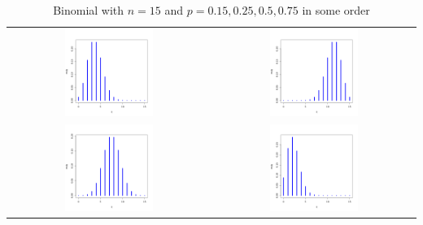 \begin{table}[h]  
  \begin{tabular}{cc} 
    \includegraphics[width=0.45\textwidth]{existing-materials/ProbabilityNotes_23-24/images/binom15P25.png} & 
    \includegraphics[width=0.45\textwidth]{existing-materials/ProbabilityNotes_23-24/images/binom15P75.png} \\
     \includegraphics[width=0.45\textwidth]{existing-materials/ProbabilityNotes_23-24/images/binom15P5.png} & 
    \includegraphics[width=0.45\textwidth]{existing-materials/ProbabilityNotes_23-24/images/binom15P15.png} \\
  \end{tabular}
 \caption{\label{binpics} Binomial with $n=15$ and $p=0.15, 0.25, 0.5, 0.75$ in some order}
\end{table}


